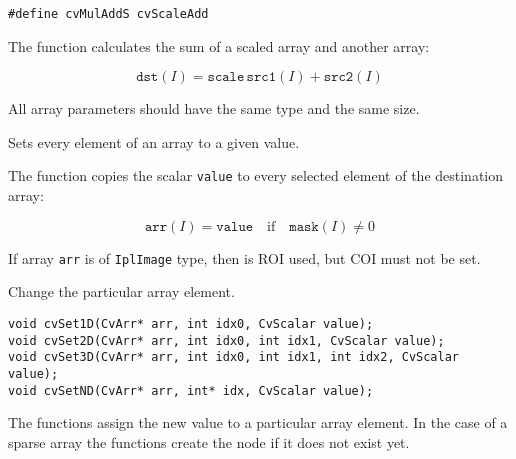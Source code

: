 \begin{lstlisting}
#define cvMulAddS cvScaleAdd
\end{lstlisting}

The function calculates the sum of a scaled array and another array:

\[
\texttt{dst}(I)=\texttt{scale} \, \texttt{src1}(I) + \texttt{src2}(I)
\]

All array parameters should have the same type and the same size.

Sets every element of an array to a given value.


\begin{description}
\end{description}


The function copies the scalar \texttt{value} to every selected element of the destination array:

\[
\texttt{arr}(I)=\texttt{value} \quad \text{if} \quad \texttt{mask}(I) \ne 0
\]

If array \texttt{arr} is of \texttt{IplImage} type, then is ROI used, but COI must not be set.

\ifC %
Change the particular array element.

\begin{lstlisting}
void cvSet1D(CvArr* arr, int idx0, CvScalar value);
void cvSet2D(CvArr* arr, int idx0, int idx1, CvScalar value);
void cvSet3D(CvArr* arr, int idx0, int idx1, int idx2, CvScalar value);
void cvSetND(CvArr* arr, int* idx, CvScalar value);
\end{lstlisting}

\begin{description}
\end{description}

The functions assign the new value to a particular array element. In the case of a sparse array the functions create the node if it does not exist yet.

